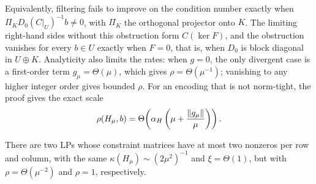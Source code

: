 Equivalently, filtering fails to improve on the condition number exactly
when $\Pi_KD_0(C|_U)^{-1}b\ne0$, with $\Pi_K$ the orthogonal projector
onto $K$.  The limiting right-hand sides without this obstruction form
$C(\ker F)$, and the obstruction vanishes for every $b\in U$ exactly when
$F=0$, that is, when $D_0$ is block diagonal in $U\oplus K$.  Analyticity
also limits the rates: when $g=0$, the only divergent case is a first-order
term $g_\mu=\Theta(\mu)$, which gives $\rho=\Theta(\mu^{-1})$; vanishing to
any higher integer order gives bounded $\rho$.  For an encoding that is not
norm-tight, the proof gives the exact scale
\begin{equation}
 \rho(H_\mu,b)=\Theta\!\left(
 \alpha_H\left(\mu+\frac{\lVert g_\mu\rVert}\mu\right)\right).
 \label{eq:coupling-nontight}
\end{equation}

\begin{proposition}
\label{prop:coupling-witnesses}
There are two LPs whose constraint matrices have at most two nonzeros per
row and column, with the same $\kappa(H_\mu)\sim(2\mu^2)^{-1}$ and
$\xi=\Theta(1)$, but with $\rho=\Theta(\mu^{-2})$ and $\rho=1$,
respectively.
\end{proposition}

